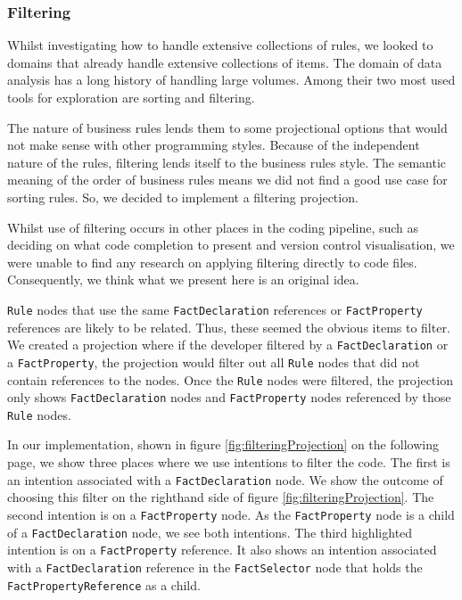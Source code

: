 \subsubsection{Filtering}
Whilst investigating how to handle extensive collections of rules, we looked to domains that already handle extensive collections of items.
The domain of data analysis has a long history of handling large volumes.
Among their two most used tools for exploration are sorting and filtering.

The nature of business rules lends them to some projectional options that would not make sense with other programming styles.
Because of the independent nature of the rules, filtering lends itself to the business rules style.
The semantic meaning of the order of business rules means we did not find a good use case for sorting rules.
So, we decided to implement a filtering projection.

Whilst use of filtering occurs in other places in the coding pipeline, such as deciding on what code completion to present\cite{hou2010towards} and version control visualisation\cite{yoon2013visualization}, we were unable to find any research on applying filtering directly to code files.
Consequently, we think what we present here is an original idea.

\texttt{Rule} nodes that use the same \texttt{FactDeclaration} references or \texttt{FactProperty} references are likely to be related.
Thus, these seemed the obvious items to filter.
We created a projection where if the developer filtered by a \texttt{FactDeclaration} or a \texttt{FactProperty}, the projection would filter out all \texttt{Rule} nodes that did not contain references to the nodes.
Once the \texttt{Rule} nodes were filtered, the projection only shows \texttt{FactDeclaration} nodes and \texttt{FactProperty} nodes referenced by those \texttt{Rule} nodes.

In our implementation, shown in figure \ref{fig:filteringProjection} on the following page, we show three places where we use intentions to filter the code.
The first is an intention associated with a \texttt{FactDeclaration} node.
We show the outcome of choosing this filter on the righthand side of figure \ref{fig:filteringProjection}.
The second intention is on a \texttt{FactProperty} node.
As the \texttt{FactProperty} node is a child of a \texttt{FactDeclaration} node, we see both intentions.
The third highlighted intention is on a \texttt{FactProperty} reference.
It also shows an intention associated with a \texttt{FactDeclaration} reference in the \texttt{FactSelector} node that holds the \texttt{FactPropertyReference} as a child.


